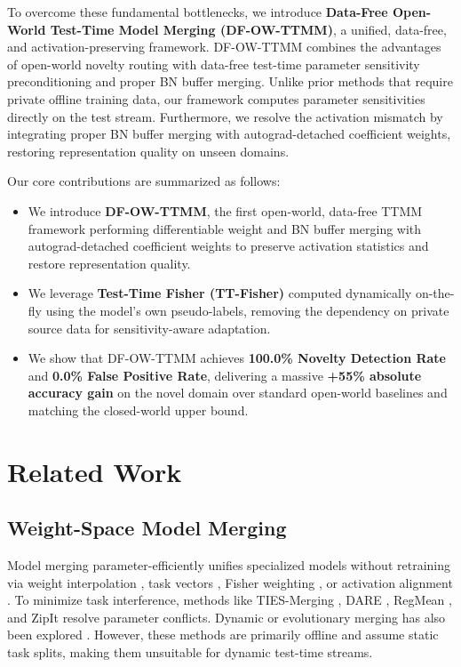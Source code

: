 \documentclass{article}
\theoremstyle{plain}
\theoremstyle{definition}
\theoremstyle{remark}
\begin{document}
To overcome these fundamental bottlenecks, we introduce \textbf{Data-Free Open-World Test-Time Model Merging (DF-OW-TTMM)}, a unified, data-free, and activation-preserving framework. DF-OW-TTMM combines the advantages of open-world novelty routing with data-free test-time parameter sensitivity preconditioning and proper BN buffer merging. Unlike prior methods that require private offline training data, our framework computes parameter sensitivities directly on the test stream. Furthermore, we resolve the activation mismatch by integrating proper BN buffer merging with autograd-detached coefficient weights, restoring representation quality on unseen domains.

Our core contributions are summarized as follows:
\begin{itemize}
    \item We introduce \textbf{DF-OW-TTMM}, the first open-world, data-free TTMM framework performing differentiable weight and BN buffer merging with autograd-detached coefficient weights to preserve activation statistics and restore representation quality.
    \item We leverage \textbf{Test-Time Fisher (TT-Fisher)} computed dynamically on-the-fly using the model's own pseudo-labels, removing the dependency on private source data for sensitivity-aware adaptation.
    \item We show that DF-OW-TTMM achieves \textbf{100.0\% Novelty Detection Rate} and \textbf{0.0\% False Positive Rate}, delivering a massive \textbf{+55\% absolute accuracy gain} on the novel domain over standard open-world baselines and matching the closed-world upper bound.
\end{itemize}

\section{Related Work}
\label{sec:related}

\subsection{Weight-Space Model Merging}
Model merging parameter-efficiently unifies specialized models without retraining \cite{ainsworth2022rebasin, akiba2024evolutionary, song2026model} via weight interpolation \cite{you2019efficient}, task vectors \cite{ilharco2023editing, cheng2025whoever, tao2024task, sun2025task}, Fisher weighting \cite{marczak2025task, hagenauer2015weighted}, or activation alignment \cite{crisostomi2024cm}. To minimize task interference, methods like TIES-Merging \cite{yadav2023ties, yadav2024what}, DARE \cite{yu2024stamp}, RegMean \cite{gargiulo2024task}, and ZipIt \cite{qiu2025mingle} resolve parameter conflicts. Dynamic or evolutionary merging has also been explored \cite{touayouch2025divmerge, chen2025layeraware}. However, these methods are primarily offline and assume static task splits, making them unsuitable for dynamic test-time streams.
\end{document}
